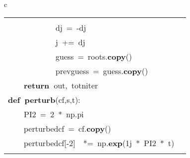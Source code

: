 \documentclass{article}\usepackage[]{graphicx}\usepackage[dvipsnames,table]{xcolor}
\makeatletter
\newcommand{\hlnum}[1]{\textcolor[rgb]{0.686,0.059,0.569}{#1}}%
\newcommand{\hlopt}[1]{\textcolor[rgb]{0,0,0}{#1}}%
\newcommand{\hldef}[1]{\textcolor[rgb]{0.345,0.345,0.345}{#1}}%
\newcommand{\hlkwa}[1]{\textcolor[rgb]{0.161,0.373,0.58}{\textbf{#1}}}%
\newcommand{\hlkwb}[1]{\textcolor[rgb]{0.69,0.353,0.396}{#1}}%
\newcommand{\hlkwd}[1]{\textcolor[rgb]{0.737,0.353,0.396}{\textbf{#1}}}%
\newenvironment{kframe}{%
 \def\at@end@of@kframe{}%
 \ifinner\ifhmode%
  \def\at@end@of@kframe{\end{minipage}}%
  \begin{minipage}{\columnwidth}%
 \fi\fi%
 \def\FrameCommand##1{\hskip\@totalleftmargin \hskip-\fboxsep
 \colorbox{shadecolor}{##1}\hskip-\fboxsep
     \hskip-\linewidth \hskip-\@totalleftmargin \hskip\columnwidth}%
 \MakeFramed {\advance\hsize-\width
   \@totalleftmargin\z@ \linewidth\hsize
   \@setminipage}}%
 {\par\unskip\endMakeFramed%
 \at@end@of@kframe}
\newenvironment{knitrout}{}{} %
\makeatother
\begin{document}
\begin{center}
\begin{tabular}{c}
\begin{tabular}{m{10cm}m{10cm}}
\begin{minipage}[m]{10cm}
\begin{knitrout}
\begin{kframe}
\hldef{}\hldef{\ \ \ \ \ \ \ \ \ \ \ \ }\hldef{i\ }\hlopt{+=\ }\hldef{}\hlnum{1}\hspace*{\fill}\\
\hldef{}\hldef{\ \ \ \ \ \ \ \ \ \ \ \ }\hldef{dj\ }\hlopt{=\ {-}}\hldef{dj}\hspace*{\fill}\\
\hldef{}\hldef{\ \ \ \ \ \ \ \ \ \ \ \ }\hldef{j\ }\hlopt{+=\ }\hldef{dj}\hspace*{\fill}\\
\hldef{}\hldef{\ \ \ \ \ \ \ \ \ \ \ \ }\hldef{guess\ }\hlopt{=\ }\hldef{roots}\hlopt{.}\hldef{}\hlkwd{copy}\hldef{}\hlopt{()}\hspace*{\fill}\\
\hldef{}\hldef{\ \ \ \ \ \ \ \ \ \ \ \ }\hldef{prev\textunderscore guess\ }\hlopt{=\ }\hldef{guess}\hlopt{.}\hldef{}\hlkwd{copy}\hldef{}\hlopt{()}\hspace*{\fill}\\
\hldef{}\hldef{\ \ \ \ }\hldef{}\hlkwa{return\ }\hldef{out}\hlopt{,\ }\hldef{tot\textunderscore niter}\hspace*{\fill}
\mbox{}
\normalfont
\end{kframe}
\end{knitrout}
\end{minipage}
&
\begin{minipage}[m]{10cm}
\begin{knitrout}\tiny
\definecolor{shadecolor}{rgb}{0.969, 0.969, 0.969}\color{fgcolor}\begin{kframe}
\noindent
\ttfamily
\hldef{}\hlkwb{@njit}\hspace*{\fill}\\
\hldef{}\hlkwa{def\ }\hldef{}\hlkwd{perturb\textunderscore 1}\hldef{}\hlopt{(}\hldef{cf}\hlopt{,}\hldef{s}\hlopt{,}\hldef{t}\hlopt{):}\hspace*{\fill}\\
\hldef{}\hldef{\ \ \ \ }\hldef{PI2\ }\hlopt{=\ }\hldef{}\hlnum{2\ }\hldef{}\hlopt{{*}\ }\hldef{np}\hlopt{.}\hldef{pi}\hspace*{\fill}\\
\hldef{}\hldef{\ \ \ \ }\hldef{perturbed\textunderscore cf\ }\hlopt{=\ }\hldef{cf}\hlopt{.}\hldef{}\hlkwd{copy}\hldef{}\hlopt{()}\hspace*{\fill}\\
\hldef{}\hldef{\ \ \ \ }\hldef{perturbed\textunderscore cf}\hlopt{{[}{-}}\hldef{}\hlnum{2}\hldef{}\hlopt{{]}}\hldef{\ \ }\hlopt{{*}=\ }\hldef{np}\hlopt{.}\hldef{}\hlkwd{exp}\hldef{}\hlopt{(}\hldef{}\hlnum{1}\hldef{j\ }\hlopt{{*}\ }\hldef{PI2\ }\hlopt{{*}\ }\hldef{t}\hlopt{)}\hspace*{\fill}\\

\end{kframe}
\end{knitrout}
\end{minipage}
\end{tabular}
\end{tabular}
\end{center}
\end{document}
